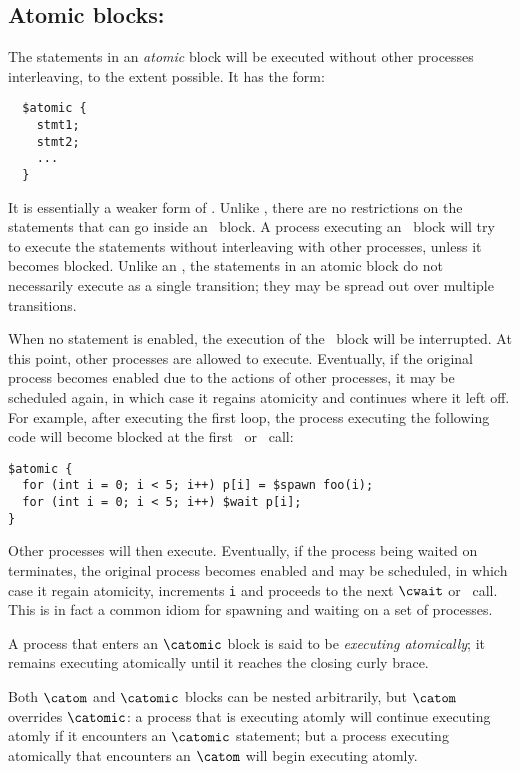 \subsection{Atomic blocks: \catomic}

The statements in an \emph{atomic} block will be executed without
other processes interleaving, to the extent possible.  It has the
form:
\begin{verbatim}
  $atomic {
    stmt1;
    stmt2;
    ...
  }
\end{verbatim}
It is essentially a weaker form of \catom.  Unlike \catom, there are
no restrictions on the statements that can go inside an \catomic\
block.  A process executing an \catomic~block will try to execute the
statements without interleaving with other processes, unless it
becomes blocked.  Unlike an \catom, the statements in an atomic block
do not necessarily execute as a single transition; they may be spread
out over multiple transitions.

When no statement is enabled, the execution of the \catomic\ block
will be interrupted.  At this point, other processes are allowed to
execute.  Eventually, if the original process becomes enabled due to
the actions of other processes, it may be scheduled again, in which
case it regains atomicity and continues where it left off.  For
example, after executing the first loop, the process executing the
following code will become blocked at the first \cwait\ or \cwaitall\ call:
 \begin{verbatim}  
$atomic {
  for (int i = 0; i < 5; i++) p[i] = $spawn foo(i);
  for (int i = 0; i < 5; i++) $wait p[i];
}
\end{verbatim}
Other processes will then execute. Eventually, if the process being
waited on terminates, the original process becomes enabled and may be
scheduled, in which case it regain atomicity, increments \texttt{i}
and proceeds to the next $\cwait$ or \cwaitall\ call.  This is in fact a common
idiom for spawning and waiting on a set of processes.

A process that enters an $\catomic$ block is said to be
\emph{executing atomically}; it remains executing atomically until it
reaches the closing curly brace.

Both $\catom$ and $\catomic$ blocks can be nested arbitrarily, but
$\catom$ overrides $\catomic$: a process that is executing atomly will
continue executing atomly if it encounters an $\catomic$ statement;
but a process executing atomically that encounters an $\catom$ will
begin executing atomly.

